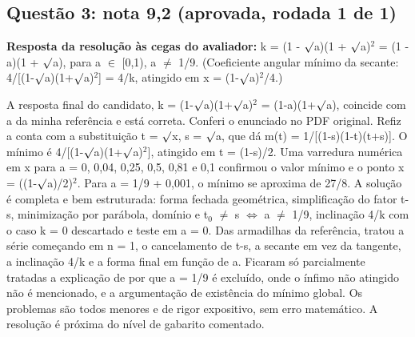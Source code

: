 \documentclass{article}%
\begin{document}
\subsection*{Questão 3: nota 9,2 (aprovada, rodada 1 de 1)}%
\textbf{Resposta da resolução às cegas do avaliador:} k = (1 - $\surd$a)(1 + $\surd$a)$^2$ = (1 - a)(1 + $\surd$a), para a $\in$ {[}0,1), a $\neq$ 1/9. (Coeficiente angular mínimo da secante: 4/{[}(1-$\surd$a)(1+$\surd$a)$^2${]} = 4/k, atingido em x = (1-$\surd$a)$^2$/4.)\par %
A resposta final do candidato, k = (1-$\surd$a)(1+$\surd$a)$^2$ = (1-a)(1+$\surd$a), coincide com a da minha referência e está correta. Conferi o enunciado no PDF original. Refiz a conta com a substituição t = $\surd$x, s = $\surd$a, que dá m(t) = 1/{[}(1-s)(1-t)(t+s){]}. O mínimo é 4/{[}(1-$\surd$a)(1+$\surd$a)$^2${]}, atingido em t = (1-s)/2. Uma varredura numérica em x para a = 0, 0,04, 0,25, 0,5, 0,81 e 0,1 confirmou o valor mínimo e o ponto x = ((1-$\surd$a)/2)$^2$. Para a = 1/9 + 0,001, o mínimo se aproxima de 27/8. A solução é completa e bem estruturada: forma fechada geométrica, simplificação do fator t-s, minimização por parábola, domínio e t$_{0}$ $\neq$ s $\Leftrightarrow$ a $\neq$ 1/9, inclinação 4/k com o caso k = 0 descartado e teste em a = 0. Das armadilhas da referência, tratou a série começando em n = 1, o cancelamento de t-s, a secante em vez da tangente, a inclinação 4/k e a forma final em função de a. Ficaram só parcialmente tratadas a explicação de por que a = 1/9 é excluído, onde o ínfimo não atingido não é mencionado, e a argumentação de existência do mínimo global. Os problemas são todos menores e de rigor expositivo, sem erro matemático. A resolução é próxima do nível de gabarito comentado.%
\end{document}
